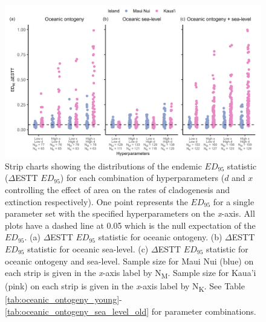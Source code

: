 \begin{figure}
    \centering
    \includegraphics[width=\textwidth]{JBI-21-0508_FigS2.png}
    \caption{Strip charts showing the distributions of the endemic $ED_{95}$ statistic ($\Delta$ESTT $ED_{95}$) for each combination of hyperparameters ($d$ and $x$ controlling the effect of area on the rates of cladogenesis and extinction respectively). One point represents the $ED_{95}$ for a single parameter set with the specified hyperparameters on the \textit{x}-axis. All plots have a dashed line at 0.05 which is the null expectation of the $ED_{95}$. (a) $\Delta$ESTT $ED_{95}$ statistic for oceanic ontogeny. (b) $\Delta$ESTT $ED_{95}$ statistic for oceanic sea-level. (c) $\Delta$ESTT $ED_{95}$ statistic for oceanic ontogeny and sea-level. Sample size for Maui Nui (blue) on each strip is given in the \textit{x}-axis label by N\textsubscript{M}. Sample size for Kaua'i (pink) on each strip is given in the \textit{x}-axis label by N\textsubscript{K}. See Table \ref{tab:oceanic_ontogeny_young}-\ref{tab:oceanic_ontogeny_sea_level_old} for parameter combinations.}
    \label{fig:Hyperparameters_endemic}
\end{figure}

